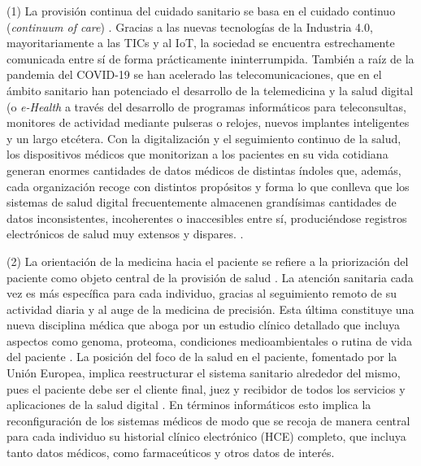 (1) La provisión continua del cuidado sanitario se basa en el cuidado continuo (\textit{continuum of care}) \cite{kouroubali2019new}. Gracias a las nuevas tecnologías de la Industria 4.0, mayoritariamente a las TICs y al IoT, la sociedad se encuentra estrechamente comunicada entre sí de forma prácticamente ininterrumpida. También a raíz de la pandemia del COVID-19 se han acelerado las telecomunicaciones, que en el ámbito sanitario han potenciado el desarrollo de la telemedicina y la salud digital (o \textit{e-Health} \cite{martin2021ehealth} a través del desarrollo de programas informáticos para teleconsultas, monitores de actividad mediante pulseras o relojes, nuevos implantes inteligentes y un largo etcétera. Con la digitalización y el seguimiento continuo de la salud, los dispositivos médicos que monitorizan a los pacientes en su vida cotidiana generan enormes cantidades de datos médicos de distintas índoles que, además, cada organización recoge con distintos propósitos y forma lo que conlleva que los sistemas de salud digital frecuentemente almacenen grandísimas cantidades de datos inconsistentes, incoherentes o inaccesibles entre sí, produciéndose registros electrónicos de salud muy extensos y dispares. \cite{kouroubali2019new}. 


(2) La orientación de la medicina hacia el paciente se refiere a la priorización del paciente como objeto central de la provisión de salud  \cite{tortorella2020healthcare}. La atención sanitaria cada vez es más específica para cada individuo, gracias al seguimiento remoto de su actividad diaria y al auge de la medicina de precisión. Esta última constituye una nueva disciplina médica que aboga por un estudio clínico detallado que incluya aspectos como genoma, proteoma, condiciones medioambientales o rutina de vida del paciente \cite{ruiz2023inteligencia}. La posición del foco de la salud en el paciente, fomentado por la Unión Europea,  implica reestructurar el sistema sanitario alrededor del mismo, pues el paciente debe ser el cliente final, juez y recibidor de todos los servicios y aplicaciones de la salud digital \cite{ntafi2022legal} \cite{katehakis2019framework}. En términos informáticos esto implica la reconfiguración de los sistemas médicos de modo que se recoja de manera central para cada individuo su historial clínico electrónico (HCE) completo, que incluya tanto datos médicos, como farmaceúticos y otros datos de interés.  


